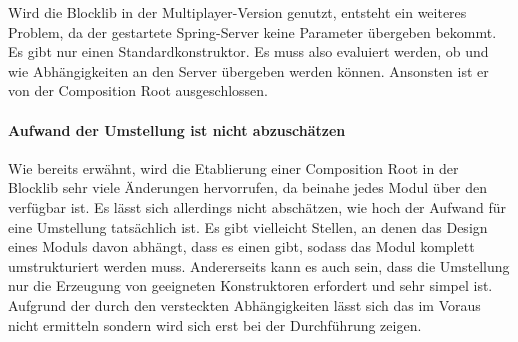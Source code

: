 Wird die Blocklib in der Multiplayer-Version genutzt, entsteht ein weiteres Problem, da der gestartete Spring-Server keine Parameter übergeben bekommt. Es gibt nur einen Standardkonstruktor. Es muss also evaluiert werden, ob und wie Abhängigkeiten an den Server übergeben werden können. Ansonsten ist er von der Composition Root ausgeschlossen.

\paragraph{Aufwand der Umstellung ist nicht abzuschätzen}
Wie bereits erwähnt, wird die Etablierung einer Composition Root in der Blocklib sehr viele Änderungen hervorrufen, da beinahe jedes Modul über den  verfügbar ist. Es lässt sich allerdings nicht abschätzen, wie hoch der Aufwand für eine Umstellung tatsächlich ist. Es gibt vielleicht Stellen, an denen das Design eines Moduls davon abhängt, dass es einen  gibt, sodass das Modul komplett umstrukturiert werden muss. Andererseits kann es auch sein, dass die Umstellung nur die Erzeugung von geeigneten Konstruktoren erfordert und sehr simpel ist. Aufgrund der durch den  versteckten Abhängigkeiten lässt sich das im Voraus nicht ermitteln sondern wird sich erst bei der Durchführung zeigen.
